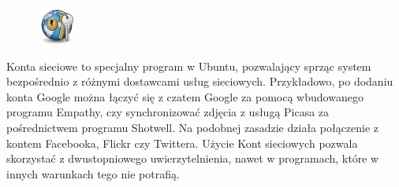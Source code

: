 \begin{figure}
	\vspace{-10pt}
	\includegraphics[width=\linewidth]{images/ikony_kontaonline.png}
\end{figure}

\textcolor{ubuntu_orange}{Konta sieciowe} to specjalny program w Ubuntu, pozwalający sprząc system bezpośrednio z różnymi dostawcami usług sieciowych. Przykładowo, po dodaniu konta Google można łączyć się z czatem Google za pomocą wbudowanego programu Empathy, czy synchronizować zdjęcia z usługą Picasa za pośrednictwem programu Shotwell. Na podobnej zasadzie działa połączenie z kontem Facebooka, Flickr czy Twittera. Użycie \textcolor{ubuntu_orange}{Kont sieciowych} pozwala skorzystać z dwustopniowego uwierzytelnienia, nawet w programach, które w innych warunkach tego nie potrafią.

